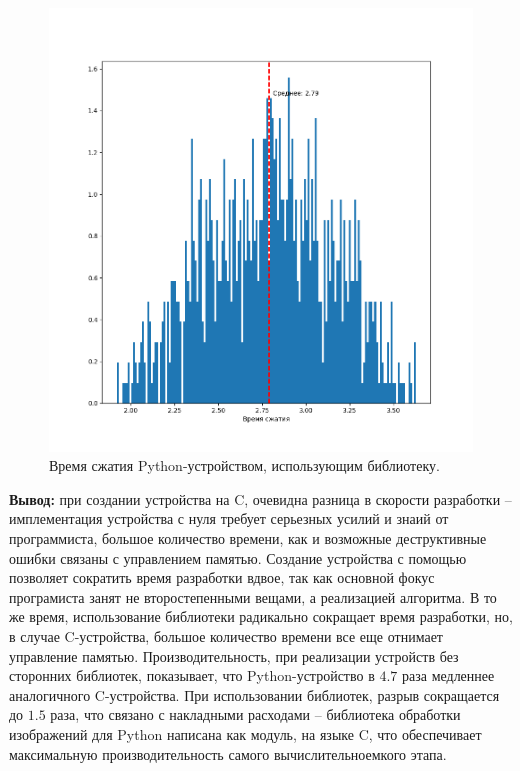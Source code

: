 \begin{figure}[!htbp]
    \centering
    \begin{adjustbox}{max totalsize={\textwidth}{\textheight}}
        \includegraphics{images/hist-lib-py-dev.png}
    \end{adjustbox}
    \caption{Время сжатия Python-устройством, использующим библиотеку.}\label{fig:hist-lib-py-dev}
\end{figure}

\textbf{Вывод:} при создании устройства на C, очевидна разница
в скорости разработки -- имплементация устройства с нуля
требует серьезных усилий и знаий от программиста, большое количество
времени, как и возможные деструктивные ошибки связаны с управлением
памятью. Создание устройства с помощью {\mylanguage} позволяет
сократить время разработки вдвое, так как основной фокус програмиста
занят не второстепенными вещами, а реализацией алгоритма.
В то же время, использование библиотеки радикально сокращает
время разработки, но, в случае C-устройства, большое количество
времени все еще отнимает управление памятью.
Производительность, при реализации устройств без сторонних
библиотек, показывает, что Python-устройство в $4.7$ раза
медленнее аналогичного C-устройства. При использовании
библиотек, разрыв сокращается до $1.5$ раза, что связано
с накладными расходами -- библиотека обработки изображений
для Python написана как модуль, на языке C, что обеспечивает
максимальную производительность самого вычислительноемкого этапа.

